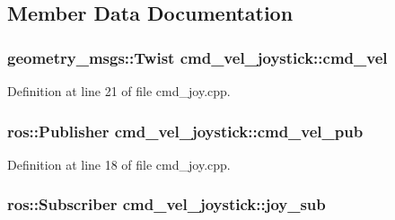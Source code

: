 \subsection{Member Data Documentation}
\hypertarget{classcmd__vel__joystick_a8f909c2268739f4aad576786c8876576}{
\subsubsection[{cmd\-\_\-vel}]{\setlength{\rightskip}{0pt plus 5cm}geometry\-\_\-msgs\-::\-Twist cmd\-\_\-vel\-\_\-joystick\-::cmd\-\_\-vel\hspace{0.3cm}{\ttfamily [private]}}}\label{classcmd__vel__joystick_a8f909c2268739f4aad576786c8876576}


Definition at line 21 of file cmd\-\_\-joy.\-cpp.

\hypertarget{classcmd__vel__joystick_a8c089e3c358de60bd10ab17a2553dc44}{
\subsubsection[{cmd\-\_\-vel\-\_\-pub}]{\setlength{\rightskip}{0pt plus 5cm}ros\-::\-Publisher cmd\-\_\-vel\-\_\-joystick\-::cmd\-\_\-vel\-\_\-pub\hspace{0.3cm}{\ttfamily [private]}}}\label{classcmd__vel__joystick_a8c089e3c358de60bd10ab17a2553dc44}


Definition at line 18 of file cmd\-\_\-joy.\-cpp.

\hypertarget{classcmd__vel__joystick_a2947a21136647b829b50058c0ced8b01}{
\subsubsection[{joy\-\_\-sub}]{\setlength{\rightskip}{0pt plus 5cm}ros\-::\-Subscriber cmd\-\_\-vel\-\_\-joystick\-::joy\-\_\-sub\hspace{0.3cm}{\ttfamily [private]}}}\label{classcmd__vel__joystick_a2947a21136647b829b50058c0ced8b01}


